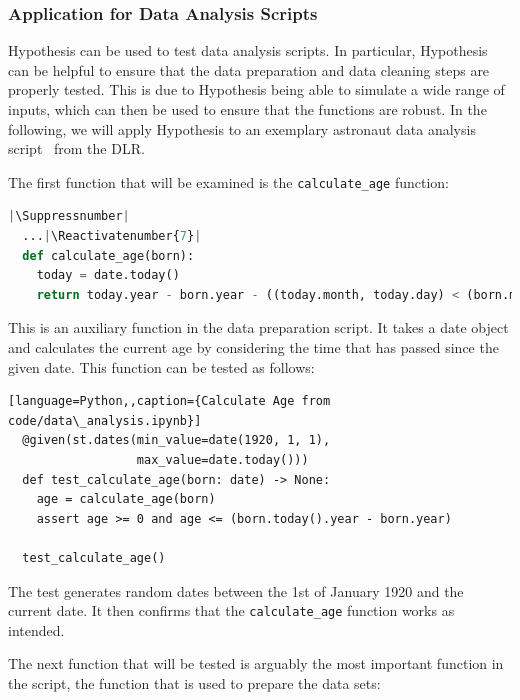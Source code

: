 \documentclass[runningheads]{llncs}
\makeatletter
\let\origthelstnumber\thelstnumber
\newcommand*\Suppressnumber{%
  \lst@AddToHook{OnNewLine}{%
    \let\thelstnumber\relax%
     \advance\c@lstnumber-\@ne\relax%
    }%
}
\newcommand*\Reactivatenumber[1]{%
  \setcounter{lstnumber}{\numexpr#1-1\relax}
  \lst@AddToHook{OnNewLine}{%
   \let\thelstnumber\origthelstnumber%
   \refstepcounter{lstnumber}%
  }%
}
\makeatother
\begin{document}
\subsubsection{Application for Data Analysis Scripts}
Hypothesis can be used to test data analysis scripts. In particular, Hypothesis can be helpful to ensure that the data preparation and data cleaning steps are properly tested. This is due to Hypothesis being able to simulate a wide range of inputs, which can then be used to ensure that the functions are robust. In the following, we will apply Hypothesis to an exemplary astronaut data analysis script~\cite{Stoffers2021} from the DLR.

\newpage
\noindent The first function that will be examined is the \texttt{calculate\_age} function:

\begin{lstlisting}[language=Python,caption={Calculate Age from code/data\_analysis.ipynb}]
  |\Suppressnumber|
  ...|\Reactivatenumber{7}|
  def calculate_age(born):
    today = date.today()
    return today.year - born.year - ((today.month, today.day) < (born.month, born.day))
\end{lstlisting}
This is an auxiliary function in the data preparation script. It takes a date object and calculates the current age by considering the time that has passed since the given date. This function can be tested as follows:

\begin{lstlisting}[language=Python,,caption={Calculate Age from code/data\_analysis.ipynb}]
  @given(st.dates(min_value=date(1920, 1, 1), 
                  max_value=date.today()))
  def test_calculate_age(born: date) -> None:
    age = calculate_age(born)
    assert age >= 0 and age <= (born.today().year - born.year)
  
  test_calculate_age()
\end{lstlisting}
The test generates random dates between the 1st of January 1920 and the current date. It then confirms that the \texttt{calculate\_age} function works as intended.

\vspace{5mm}
\noindent The next function that will be tested is arguably the most important function in the script, the function that is used to prepare the data sets:
\end{document}
